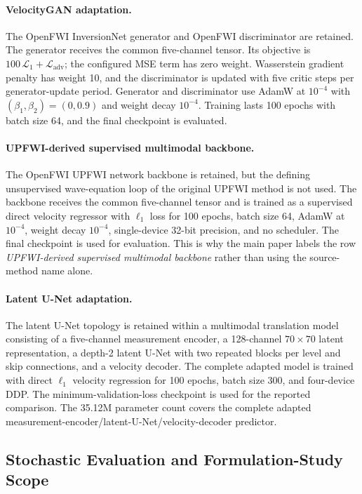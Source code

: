 \paragraph{VelocityGAN adaptation.}
The OpenFWI InversionNet generator and OpenFWI discriminator are retained. The generator receives the common five-channel tensor. Its objective is $100\,\mathcal L_1+\mathcal L_{\mathrm{adv}}$; the configured MSE term has zero weight. Wasserstein gradient penalty has weight 10, and the discriminator is updated with five critic steps per generator-update period. Generator and discriminator use AdamW at $10^{-4}$ with $(\beta_1,\beta_2)=(0,0.9)$ and weight decay $10^{-4}$. Training lasts 100 epochs with batch size 64, and the final checkpoint is evaluated.

\paragraph{UPFWI-derived supervised multimodal backbone.}
The OpenFWI UPFWI network backbone is retained, but the defining unsupervised wave-equation loop of the original UPFWI method is not used. The backbone receives the common five-channel tensor and is trained as a supervised direct velocity regressor with $\ell_1$ loss for 100 epochs, batch size 64, AdamW at $10^{-4}$, weight decay $10^{-4}$, single-device 32-bit precision, and no scheduler. The final checkpoint is used for evaluation. This is why the main paper labels the row \emph{UPFWI-derived supervised multimodal backbone} rather than using the source-method name alone.

\paragraph{Latent U-Net adaptation.}
The latent U-Net topology is retained within a multimodal translation model consisting of a five-channel measurement encoder, a 128-channel $70\times70$ latent representation, a depth-2 latent U-Net with two repeated blocks per level and skip connections, and a velocity decoder. The complete adapted model is trained with direct $\ell_1$ velocity regression for 100 epochs, batch size 300, and four-device DDP. The minimum-validation-loss checkpoint is used for the reported comparison. The 35.12M parameter count covers the complete adapted measurement-encoder/latent-U-Net/velocity-decoder predictor.

\subsection{Stochastic Evaluation and Formulation-Study Scope}

